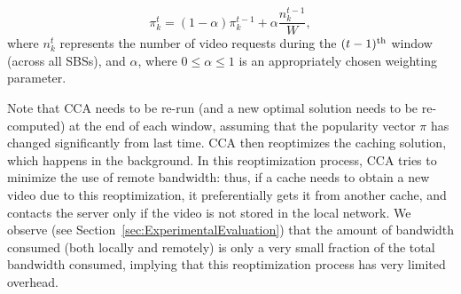 \documentclass[conference]{IEEEtran}
\begin{document}
\begin{equation}
    \pi^{t}_k = (1-\alpha) \pi^{t-1}_k + \alpha\frac{n^{t-1}_k}{W},
\end{equation}
\noindent where $n^t_k$ represents the number of video requests during the $(t-1)^{\rm th}$ window (across all SBSs), and $\alpha$, where $0 \leq \alpha \leq 1$ is an appropriately chosen weighting parameter.

Note that CCA needs to be re-run (and a new optimal solution needs to be re-computed) at the end of each window, assuming that the popularity vector $\pi$ has changed significantly from last time. CCA then reoptimizes the caching solution, which happens in the background. In this reoptimization process, CCA tries to minimize the use of remote bandwidth: thus, if a cache needs to obtain a new video due to this reoptimization, it preferentially gets it from another cache, and contacts the server only if the video is not stored in the local network. We observe (see Section~\ref{sec:ExperimentalEvaluation}) that the amount of bandwidth consumed (both locally and remotely) is only a very small fraction of the total bandwidth consumed, implying that this reoptimization process has very limited overhead. 




\end{document}
